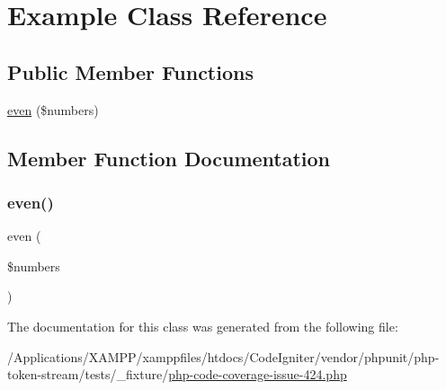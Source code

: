 \hypertarget{class_example}{}\section{Example Class Reference}
\label{class_example}
\subsection*{Public Member Functions}
\begin{DoxyCompactItemize}
\item 
\mbox{\hyperlink{class_example_af132aa0b6bbe5bfe082c76070b244f0a}{even}} (\$numbers)
\end{DoxyCompactItemize}


\subsection{Member Function Documentation}
\mbox{\label{class_example_af132aa0b6bbe5bfe082c76070b244f0a}} 
\subsubsection{\texorpdfstring{even()}{even()}}
{\footnotesize\ttfamily even (\begin{DoxyParamCaption}\item[{}]{\$numbers }\end{DoxyParamCaption})}



The documentation for this class was generated from the following file\+:\begin{DoxyCompactItemize}
\item 
/\+Applications/\+X\+A\+M\+P\+P/xamppfiles/htdocs/\+Code\+Igniter/vendor/phpunit/php-\/token-\/stream/tests/\+\_\+fixture/\mbox{\hyperlink{php-code-coverage-issue-424_8php}{php-\/code-\/coverage-\/issue-\/424.\+php}}\end{DoxyCompactItemize}

